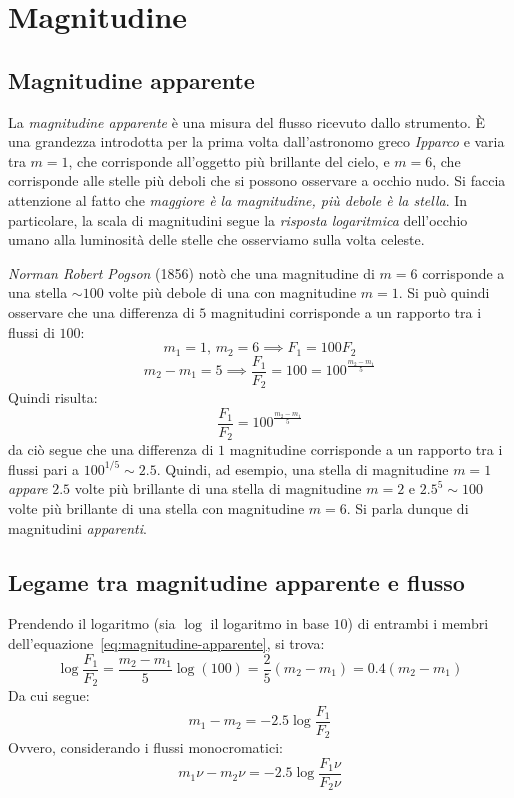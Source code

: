\section{Magnitudine}\label{sec:magnitudine}
\subsection{Magnitudine apparente}\label{sec:magnitudine-apparente}
La \emph{magnitudine apparente} è una misura del flusso ricevuto dallo strumento. È una grandezza introdotta per la prima volta dall'astronomo greco \emph{Ipparco} e varia tra $m=1$, che corrisponde all'oggetto più brillante del cielo, e $m=6$, che corrisponde alle stelle più deboli che si possono osservare a occhio nudo. Si faccia attenzione al fatto che \emph{maggiore è la magnitudine, più debole è la stella}. In particolare, la scala di magnitudini segue la \emph{risposta logaritmica} dell'occhio umano alla luminosità delle stelle che osserviamo sulla volta celeste.

\emph{Norman Robert Pogson} (1856) notò che una magnitudine di $m=6$ corrisponde a una stella $\sim 100$ volte più debole di una con magnitudine $m=1$. Si può quindi osservare che una differenza di $5$ magnitudini corrisponde a un rapporto tra i flussi di $100$:
\[
    m_1=1, \,  m_2=6 \implies F_1 = 100 F_2
\]
\[
    m_2 - m_1 = 5 \implies \frac{F_1}{F_2} = 100 = 100^{\frac{m_2 - m_1}{5}}
\]
Quindi risulta:
\begin{equation}\label{eq:magnitudine-apparente}
    \frac{F_1}{F_2} = 100^{\frac{m_2 - m_1}{5}}
\end{equation}
da ciò segue che una differenza di $1$ magnitudine corrisponde a un rapporto tra i flussi pari a $100^{1 / 5} \sim 2.5$. Quindi, ad esempio, una stella di magnitudine $m=1$ \emph{appare} $2.5$ volte più brillante di una stella di magnitudine $m=2$ e $2.5^5 \sim 100$ volte più brillante di una stella con magnitudine $m=6$. Si parla dunque di magnitudini \emph{apparenti}.

\subsection{Legame tra magnitudine apparente e flusso}\label{sec:relazione-magnitudine-apparente-flusso}
Prendendo il logaritmo (sia $\log$ il logaritmo in base $10$) di entrambi i membri dell'equazione~\eqref{eq:magnitudine-apparente}, si trova:
\[
    \log\frac{F_1}{F_2} = \frac{m_2 - m_1}{5} \log(100) = \frac{2}{5} (m_2 - m_1) = 0.4 (m_2 - m_1)
\]
Da cui segue:
\begin{equation}\label{eq:relazione-magnitudine-apparente-flusso}
    m_1 - m_2 = -2.5 \log\frac{F_1}{F_2}
\end{equation}
Ovvero, considerando i flussi monocromatici:
\begin{equation}\label{eq:relazione-magnitudine-apparente-flusso-monocromatico}
    m_1\nu - m_2\nu = -2.5 \log\frac{F_1\nu}{F_2\nu}
\end{equation}


